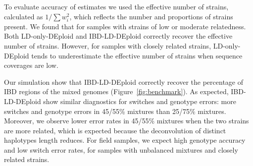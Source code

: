 \documentclass{article}
\begin{document}
To evaluate accuracy of estimates we used the effective number of strains, calculated as $1/\sum w_{i}^{2}$, which reflects the number and proportions of strains present. We found that for samples with strains of low or moderate relatedness. Both LD-only-DEploid and IBD-LD-DEploid correctly recover the effective number of strains. However, for samples with closely related strains, LD-only-DEploid tends to underestimate the effective number of strains when sequence coverages are low.

Our simulation show that IBD-LD-DEploid correctly recover the percentage of IBD regions of the mixed genomes (Figure~\ref{fig:benchmark}). As expected, IBD-LD-DEploid show similar diagnostics for switches and genotype errors: more switches and genotype errors in 45/55\% mixtures than 25/75\% mixtures. Moreover, we observe lower error rates in 45/55\% mixtures when the two strains are more related, which is expected because the deconvolution of distinct haplotypes length reduces. For field samples, we expect high genotype accuracy and low switch error rates, for samples with unbalanced mixtures and closely related strains.
\end{document}

